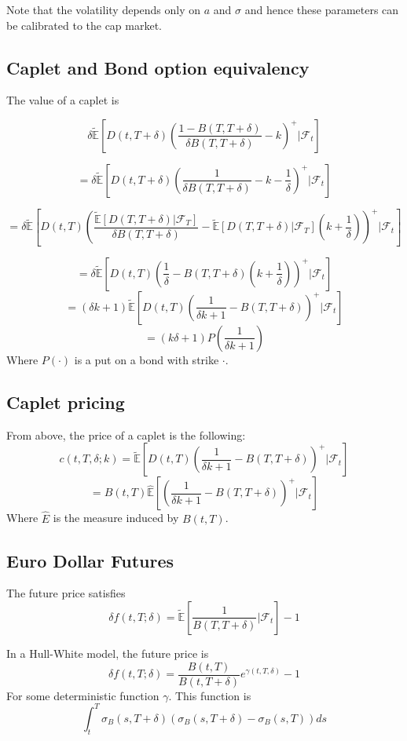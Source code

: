 \documentclass{article}
\theoremstyle{definition}
\begin{document}
Note that the volatility depends only on \(a\) and \(\sigma\) and hence these parameters can be calibrated to the cap market.

\subsection{Caplet and Bond option equivalency}
 The value of a caplet is

\[\delta\mathbb{\tilde{E}}\left[D(t, T+\delta)\left(\frac{1-B(T, T+\delta)}{\delta B(T, T+\delta)}-k\right)^+ |\mathcal{F}_t\right]\]

\[=\delta\mathbb{\tilde{E}}\left[D(t, T+\delta)\left(\frac{1}{\delta B(T, T+\delta)}-k-\frac{1}{\delta}\right)^+ |\mathcal{F}_t\right]\]

\[=\delta\mathbb{\tilde{E}}\left[D(t, T)\left(\frac{ \mathbb{\tilde{E}}[D(T, T+\delta)|\mathcal{F}_T]}{\delta B(T, T+\delta)}-\mathbb{\tilde{E}}[D(T, T+\delta)|\mathcal{F}_T]\left(k+\frac{1}{\delta}\right)\right)^+ |\mathcal{F}_t\right]\]

\[=\delta\mathbb{\tilde{E}}\left[D(t, T)\left(\frac{1}{\delta}-B(T, T+\delta)\left(k+\frac{1}{\delta}\right)\right)^+ |\mathcal{F}_t\right]\]
\[=\left(\delta k+1\right)\mathbb{\tilde{E}}\left[D(t, T)\left(\frac{1}{\delta k+1}-B(T, T+\delta)\right)^+ |\mathcal{F}_t\right]\]
\[=\left(k\delta+1\right)P\left(\frac{1}{\delta k +1}\right)\] Where \(P(\cdot)\) is a put on a bond with strike \(\cdot\).

\subsection{Caplet pricing}
From above, the price of a caplet is the following:
\[c(t, T, \delta; k)=\mathbb{\tilde{E}}\left[D(t, T)\left(\frac{1}{\delta k+1}-B(T, T+\delta)\right)^+ |\mathcal{F}_t\right]\]
\[=B(t, T)\mathbb{\hat{E}}\left[\left(\frac{1}{\delta k+1}-B(T, T+\delta)\right)^+ |\mathcal{F}_t\right]\]
Where \(\hat{E}\) is the measure induced by \(B(t, T)\).

\subsection{Euro Dollar Futures}
The future price satisfies \[\delta f(t, T; \delta)=\tilde{\mathbb{E}}\left[\frac{1}{B(T, T+\delta)}|\mathcal{F}_t\right]-1\]

In a Hull-White model, the future price is \[\delta f(t, T; \delta)=\frac{B(t, T)}{B(t, T+\delta)}e^{\gamma(t, T, \delta)}-1\]
For some deterministic function \(\gamma\).  This function is \[\int_t ^ T \sigma_B (s, T+\delta)\left(\sigma_B(s, T+\delta)-\sigma_B(s, T)\right)ds\]
\end{document}
